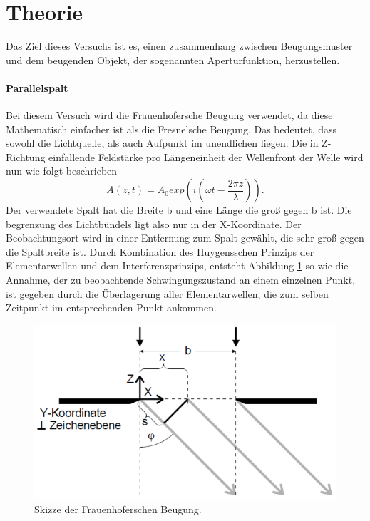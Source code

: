 \section{Theorie}
\label{sec:Theorie}
Das Ziel dieses Versuchs ist es, einen zusammenhang zwischen Beugungsmuster und dem beugenden Objekt, 
der sogenannten Aperturfunktion, herzustellen.

\paragraph{Parallelspalt}
Bei diesem Versuch wird die Frauenhofersche Beugung verwendet, da diese Mathematisch einfacher ist als die
Fresnelsche Beugung. Das bedeutet, dass sowohl die Lichtquelle, als auch Aufpunkt im unendlichen liegen.
Die in Z-Richtung einfallende Feldstärke pro Längeneinheit der Wellenfront der Welle wird nun wie folgt beschrieben
\begin{equation}
    \label{eq:1}
    A(z,t) = A_0 exp \left( i(\omega t - \frac{2 \pi z}{\lambda})\right).
\end{equation}
Der verwendete Spalt hat die Breite b und eine Länge die groß gegen b ist. Die begrenzung des Lichtbündels 
ligt also nur in der X-Koordinate. Der Beobachtungsort wird in einer Entfernung zum Spalt gewählt, die sehr groß 
gegen die Spaltbreite ist.
Durch Kombination des Huygensschen Prinzips der Elementarwellen und dem Interferenzprinzips, entsteht Abbildung \ref{fig:a} 
so wie die Annahme, der zu beobachtende Schwingungszustand an einem einzelnen Punkt, ist gegeben durch die Überlagerung 
aller Elementarwellen, die zum selben Zeitpunkt im entsprechenden Punkt ankommen.
\begin{figure}[H]
    \centering
    \includegraphics{Spalt.png}
    \caption{Skizze der Frauenhoferschen Beugung.}
    \label{fig:a}
\end{figure}
